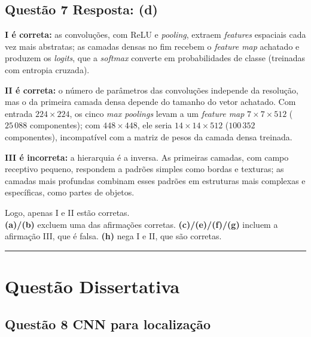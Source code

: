 \documentclass[11pt,a4paper]{article}
\begin{document}
\subsection*{Questão 7 \textemdash{} Resposta: (d)}
\textbf{I é correta:} as convoluções, com ReLU e \textit{pooling}, extraem \textit{features} espaciais cada vez mais abstratas; as camadas densas no fim recebem o \textit{feature map} achatado e produzem os \textit{logits}, que a \textit{softmax} converte em probabilidades de classe (treinadas com entropia cruzada).

\textbf{II é correta:} o número de parâmetros das convoluções independe da resolução, mas o da primeira camada densa depende do tamanho do vetor achatado. Com entrada $224 \times 224$, os cinco \textit{max poolings} levam a um \textit{feature map} $7 \times 7 \times 512$ ($25\,088$ componentes); com $448 \times 448$, ele seria $14 \times 14 \times 512$ ($100\,352$ componentes), incompatível com a matriz de pesos da camada densa treinada.

\textbf{III é incorreta:} a hierarquia é a inversa. As primeiras camadas, com campo receptivo pequeno, respondem a padrões simples como bordas e texturas; as camadas mais profundas combinam esses padrões em estruturas mais complexas e específicas, como partes de objetos.

Logo, apenas I e II estão corretas.\\
\textbf{(a)/(b)} excluem uma das afirmações corretas.
\textbf{(c)/(e)/(f)/(g)} incluem a afirmação III, que é falsa.
\textbf{(h)} nega I e II, que são corretas.

\color{black}
\rule{\linewidth}{0.4pt}

\section*{Questão Dissertativa}

\color{blue}

\subsection*{Questão 8 \textemdash{} CNN para localização}
\end{document}
